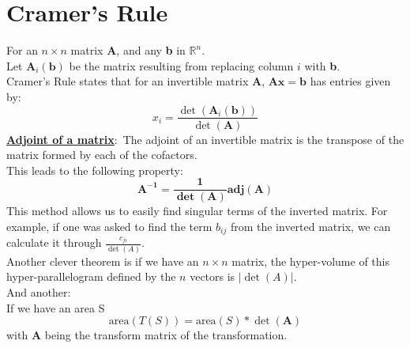 \documentclass[nobib]{tufte-handout}
\newcommand{\defn}[2]{\underline{\noindent\textbf{#1}}:\ #2}
\begin{document}
\section{Cramer's Rule}
For an $n \times n$ matrix \textbf{A}, and any \textbf{b} in $\mathbb{R}^n$.\\
Let $\mathbf{A}_i(\mathbf{b})$ be the matrix resulting from replacing column
$i$ with \textbf{b}.\\ Cramer's Rule states that for an invertible matrix
\textbf{A}, $\mathbf{Ax = b}$ has entries given by:
\begin{equation*}
    x_i= \frac{\det(\mathbf{A}_i(\mathbf{b}))}{\det(\mathbf{A})}
\end{equation*}
\defn{Adjoint of a matrix}{The adjoint of an invertible matrix is the transpose of the matrix formed by each of the cofactors.}\\
This leads to the following property:\\
\begin{equation*}
    \mathbf{A^{-1} = \frac{1}{\det(A)}\text{adj}(A)}
\end{equation*}
This method allows us to easily find singular terms of the inverted matrix. For example, if one was asked to find the term $b_{ij}$ from the inverted matrix, we can calculate it through $\frac{c_{ji}}{\det(A)}$.\\
Another clever theorem is if we have an $n\times n$ matrix, the hyper-volume of this hyper-parallelogram defined by the $n$ vectors is $|\det(A)|$.\\
And another:\\
If we have an area S
\begin{equation*}
    \text{area}(T(S)) = \text{area}(S)*\det(\mathbf{A})
\end{equation*}
with \textbf{A} being the transform matrix of the transformation.
\end{document}
